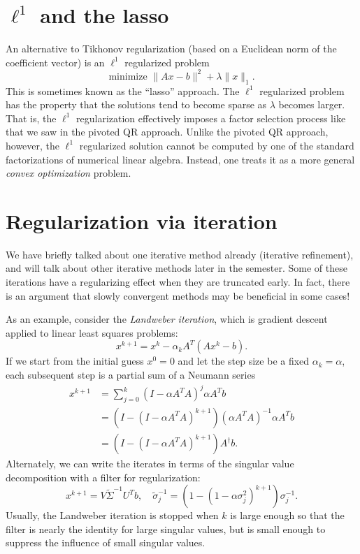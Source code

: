 \documentclass[12pt, leqno]{article} %
\begin{document}
\section{$\ell^1$ and the lasso}

An alternative to Tikhonov regularization (based on a Euclidean norm
of the coefficient vector) is an $\ell^1$ regularized problem
\[
  \mbox{minimize } \|Ax-b\|^2 + \lambda \|x\|_1.
\]
This is sometimes known as the ``lasso'' approach.  The $\ell^1$
regularized problem has the property that the solutions tend to
become sparse as $\lambda$ becomes larger.  That is, the $\ell^1$
regularization effectively imposes a factor selection process like
that we saw in the pivoted QR approach.  Unlike the pivoted QR
approach, however, the $\ell^1$ regularized solution cannot be
computed by one of the standard factorizations of numerical linear
algebra.  Instead, one treats it as a more general {\em convex
  optimization} problem.

\section{Regularization via iteration}

We have briefly talked about one iterative method already (iterative
refinement), and will talk about other iterative methods later in the
semester.  Some of these iterations have a regularizing effect when
they are truncated early.  In fact, there is an argument that slowly
convergent methods may be beneficial in some cases!

As an example, consider the {\em Landweber iteration}, which is
gradient descent applied to linear least squares problems:
\[
  x^{k+1} = x^k - \alpha_k A^T (Ax^k-b).
\]
If we start from the initial guess $x^0 = 0$ and let the step size be
a fixed $\alpha_k = \alpha$, each subsequent step is a partial sum of
a Neumann series
\begin{align*}
  x^{k+1}
  &= \sum_{j=0}^k (I-\alpha A^T A)^j \alpha A^T b \\
  &= \left(I - (I-\alpha A^TA)^{k+1} \right) (\alpha A^TA)^{-1} \alpha A^T b \\
  &= \left(I - (I-\alpha A^TA)^{k+1} \right) A^\dagger b.
\end{align*}
Alternately, we can write the iterates in terms of the singular value
decomposition with a filter for regularization:
\[
  x^{k+1} = V \tilde{\Sigma}^{-1} U^T b, \quad
  \tilde{\sigma}_j^{-1} = (1-(1-\alpha \sigma_j^2)^{k+1}) \sigma_j^{-1}.
\]
Usually, the Landweber iteration is stopped when $k$ is large enough
so that the filter is nearly the identity for large singular values,
but is small enough to suppress the influence of small singular
values.
\end{document}
